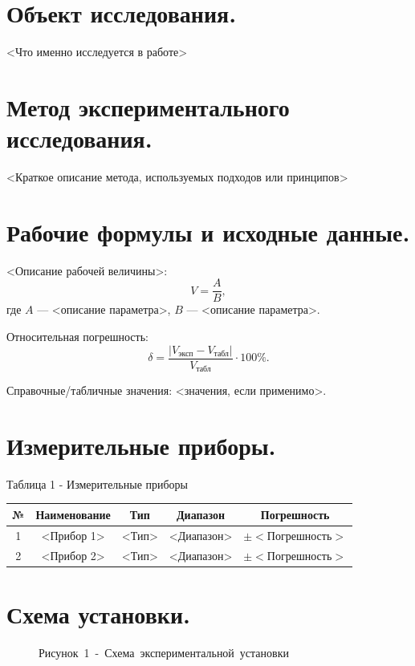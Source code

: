 \documentclass[12pt, a4paper]{article}
\begin{document}
	\section{Объект исследования.}
	<Что именно исследуется в работе>
	
	\section{Метод экспериментального исследования.}
	<Краткое описание метода, используемых подходов или принципов>
	
	\section{Рабочие формулы и исходные данные.}
	
	<Описание рабочей величины>:
	\begin{equation}
		V = \frac{A}{B},
		\label{eq:formula1}
	\end{equation}
	где \(A\) — <описание параметра>, \(B\) — <описание параметра>.
	
	Относительная погрешность:
	\begin{equation}
		\delta = \frac{|V_{\text{эксп}} - V_{\text{табл}}|}{V_{\text{табл}}} \cdot 100\%.
		\label{eq:delta}
	\end{equation}
	
	Справочные/табличные значения: <значения, если применимо>.
	
	\section{Измерительные приборы.}
	\begin{table}[H]
		\centering
		Таблица 1 - Измерительные приборы
		\begin{tabular}{|c|c|c|c|c|} \hline
			№ & Наименование & Тип & Диапазон & Погрешность \\ \hline
			1 & <Прибор 1> & <Тип> & <Диапазон> & \(\pm <\text{Погрешность}>\) \\ \hline
			2 & <Прибор 2> & <Тип> & <Диапазон> & \(\pm <\text{Погрешность}>\) \\ \hline
		\end{tabular}
	\end{table}
	
	\section{Схема установки.}
	\begin{figure}[H]
		\begin{center}
			\begin{minipage}{0.45\textwidth}
				\centering
				\mbox{Рисунок 1 - Схема экспериментальной установки}
			\end{minipage}
		\end{center}
	\end{figure}
	
\end{document}

